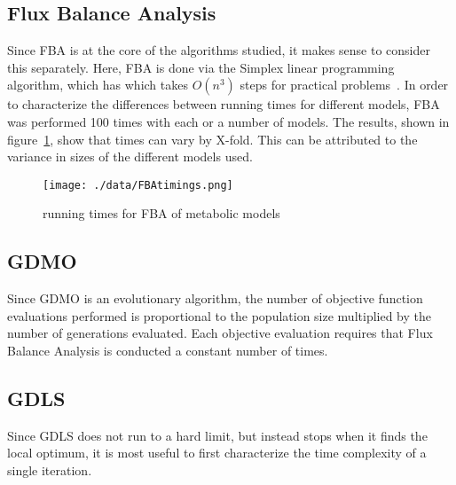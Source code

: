 \subsection{Flux Balance Analysis}
Since FBA is at the core of the algorithms studied, it makes sense to consider this separately. 
Here, FBA is done via the Simplex linear programming algorithm, which has which takes \(O(n^3)\) steps for practical problems~\cite{Dantzig1963}. 
In order to characterize the differences between running times for different models, FBA was performed 100 times with each or a number of models. The results, shown in figure~\ref{fig:FBAtimings}, show that times can vary by  X-fold. This can be attributed to the variance in sizes of the different models used.

\begin{figure}
\label{fig:FBAtimings}
\texttt{[image: ./data/FBAtimings.png]}
\caption{running times for FBA of metabolic models}
\end{figure}

\subsection{GDMO}
Since GDMO is an evolutionary algorithm, the number of objective function evaluations performed is proportional to the population size multiplied by the number of generations evaluated. Each objective evaluation requires that Flux Balance Analysis is conducted a constant number of times.


\subsection{GDLS}
Since GDLS does not run to a hard limit, but instead stops when it finds the local optimum, it is most useful to first characterize the time complexity of a single iteration.